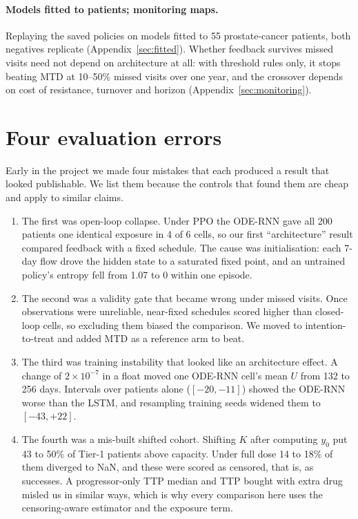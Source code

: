 \documentclass[10pt]{article}
\begin{document}
\paragraph{Models fitted to patients; monitoring maps.} Replaying the saved
policies on models fitted to 55 prostate-cancer patients, both negatives
replicate (Appendix~\ref{sec:fitted}). Whether feedback survives missed visits
need not depend on architecture at all: with threshold rules only, it stops
beating MTD at 10--50\% missed visits over one year, and the crossover depends
on cost of resistance, turnover and horizon (Appendix~\ref{sec:monitoring}).

\section{Four evaluation errors}\label{sec:pitfalls}
Early in the project we made four mistakes that each produced a result that
looked publishable. We list them because the controls that found them are cheap
and apply to similar claims.
\begin{enumerate}
\item The first was open-loop collapse. Under PPO the ODE-RNN gave all 200
patients one identical exposure in 4 of 6 cells, so our first ``architecture''
result compared feedback with a fixed schedule. The cause was initialisation:
each 7-day flow drove the hidden state to a saturated fixed point, and an
untrained policy's entropy fell from 1.07 to 0 within one episode.

\item The second was a validity gate that became wrong under missed visits. Once
observations were unreliable, near-fixed schedules scored higher than
closed-loop cells, so excluding them biased the comparison. We moved to
intention-to-treat and added MTD as a reference arm to beat.
\item The third was training instability that looked like an architecture effect.
A change of $2\times10^{-7}$ in a float moved one ODE-RNN cell's mean $U$ from
132 to 256 days. Intervals over patients alone ($[-20,-11]$) showed the ODE-RNN
worse than the LSTM, and resampling training seeds widened them to $[-43,+22]$.

\item The fourth was a mis-built shifted cohort. Shifting $K$ after computing
$y_0$ put 43 to 50\% of Tier-1 patients above capacity. Under full dose 14 to
18\% of them diverged to NaN, and these were scored as censored, that is, as
successes. A progressor-only TTP median and TTP bought with extra drug misled us
in similar ways, which is why every comparison here uses the censoring-aware
estimator and the exposure term.
\end{enumerate}
\end{document}
